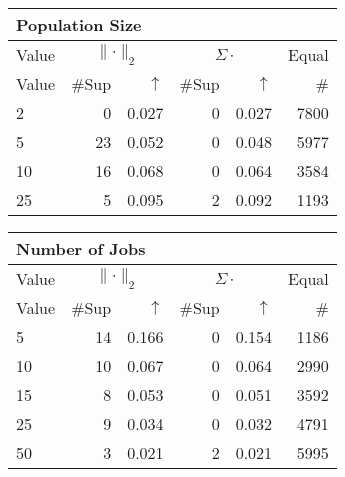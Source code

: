 \begin{center}
\renewcommand{\tabcolsep}{4pt}
\renewcommand{\arraystretch}{1.1}
\begin{customnormal}
\begin{tabular}{lrrrrr}
\multicolumn{6}{l}{Population Size}\\
\toprule
\multicolumn{1}{c}{Value} & \multicolumn{2}{c}{$\lVert \cdot \rVert_2$} & \multicolumn{2}{c}{$\Sigma \cdot$} & \multicolumn{1}{c}{Equal} \\ 
\cmidrule(lr){1-1} \cmidrule(lr){2-3} \cmidrule(lr){4-5}  \cmidrule(lr){6-6}
Value & \#Sup & $\uparrow$ & \#Sup & $\uparrow$ & \# \\ 
\midrule
2 & 0 & 0.027 & 0 & 0.027 & 7800 \\ 
5 & 23 & 0.052 & 0 & 0.048 & 5977 \\ 
10 & 16 & 0.068 & 0 & 0.064 & 3584 \\ 
25 & 5 & 0.095 & 2 & 0.092 & 1193 \\ 
\bottomrule
\end{tabular}


\end{customnormal}
\end{center}
\begin{center}
\renewcommand{\tabcolsep}{4pt}
\renewcommand{\arraystretch}{1.1}
\begin{customnormal}
\begin{tabular}{lrrrrr}
\multicolumn{6}{l}{Number of Jobs}\\
\toprule
\multicolumn{1}{c}{Value} & \multicolumn{2}{c}{$\lVert \cdot \rVert_2$} & \multicolumn{2}{c}{$\Sigma \cdot$} & \multicolumn{1}{c}{Equal} \\ 
\cmidrule(lr){1-1} \cmidrule(lr){2-3} \cmidrule(lr){4-5}  \cmidrule(lr){6-6}
Value & \#Sup & $\uparrow$ & \#Sup & $\uparrow$ & \# \\ 
\midrule
5 & 14 & 0.166 & 0 & 0.154 & 1186 \\ 
10 & 10 & 0.067 & 0 & 0.064 & 2990 \\ 
15 & 8 & 0.053 & 0 & 0.051 & 3592 \\ 
25 & 9 & 0.034 & 0 & 0.032 & 4791 \\ 
50 & 3 & 0.021 & 2 & 0.021 & 5995 \\ 
\bottomrule
\end{tabular}


\end{customnormal}
\end{center}
